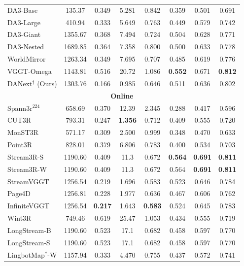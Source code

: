 \documentclass{llmxive}
\begin{document}
\begin{table}[t]
{\begin{tabular}{l c >{\columncolor{subcol}}c >{\columncolor{subcol}}c >{\columncolor{subcol}}c >{\columncolor{subcol}}c >{\columncolor{subcol}}c >{\columncolor{subcol}}c}
 DA3-Base & 135.37 & 0.349 & 5.281 & 0.842 & 0.359 & 0.501 & 0.691 \\
 DA3-Large & 410.94 & 0.333 & 5.649 & 0.763 & 0.449 & 0.579 & 0.742 \\
 DA3-Giant & 1355.67 & 0.368 & 7.494 & 0.724 & 0.504 & 0.628 & 0.771 \\
 DA3-Nested & 1689.85 & 0.364 & 7.358 & 0.800 & 0.500 & 0.633 & 0.778 \\
 WorldMirror & 1263.34 & 0.349 & 7.695 & 0.707 & 0.485 & 0.619 & 0.776 \\
 VGGT-Omega & 1143.81 & 0.516 & 20.72 & 1.086 & \cellcolor{thirdyellow}\textbf{0.552} & \cellcolor{thirdyellow}0.671 & \cellcolor{bestred}\textbf{0.812} \\ \hdashline
 DANext$^{\dagger}$ (Ours) & 1303.76 & 0.166 & 0.985 & 0.646 & 0.511 & 0.636 & 0.802 \\
\midrule
\multicolumn{8}{c}{\cellcolor{catgray}\textbf{Online}} \\
\midrule
 Spann3r$^{224}$ & 658.69 & 0.370 & 12.39 & 2.345 & 0.288 & 0.417 & 0.596 \\
 CUT3R & 793.31 & 0.247 & \textbf{1.356} & 0.712 & 0.409 & 0.555 & 0.720 \\
 MonST3R & 571.17 & 0.309 & 2.500 & 0.999 & 0.348 & 0.470 & 0.633 \\
 Point3R & 828.01 & 0.379 & 6.806 & 0.783 & 0.400 & 0.534 & 0.703 \\
 Stream3R-S & 1190.60 & 0.409 & 11.3 & 0.672 & \cellcolor{bestred}\textbf{0.564} & \cellcolor{bestred}\textbf{0.691} & \cellcolor{secondorange}\textbf{0.811} \\
 Stream3R-W & 1190.60 & 0.409 & 11.3 & 0.672 & \cellcolor{secondorange}0.564 & \cellcolor{bestred}\textbf{0.691} & \cellcolor{secondorange}\textbf{0.811} \\
 StreamVGGT & 1256.54 & 0.219 & 1.696 & \cellcolor{secondorange}0.583 & 0.523 & 0.646 & 0.784 \\
 Page4D & 1256.81 & 0.228 & 1.977 & 0.636 & 0.467 & 0.606 & 0.762 \\
 InfiniteVGGT & 1256.54 & \textbf{0.217} & 1.643 & \cellcolor{bestred}\textbf{0.583} & 0.524 & 0.645 & 0.783 \\
 Wint3R & 749.46 & 0.619 & 25.47 & 1.053 & 0.434 & 0.555 & 0.719 \\
 LongStream-B & 1190.60 & 0.523 & 17.1 & 0.682 & 0.458 & 0.597 & 0.770 \\
 LongStream-S & 1190.60 & 0.523 & 17.1 & 0.682 & 0.458 & 0.597 & 0.770 \\
 LingbotMap$^{*}$-W & 1157.94 & 0.333 & 4.470 & 0.755 & 0.437 & 0.572 & 0.741 \\

\end{tabular}}
\end{table}
\end{document}
